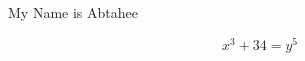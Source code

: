 \documentclass[15pt]{article}
\begin{document}
My Name is Abtahee

$$ x^3 + 34 = y^5 $$
\end{document}

